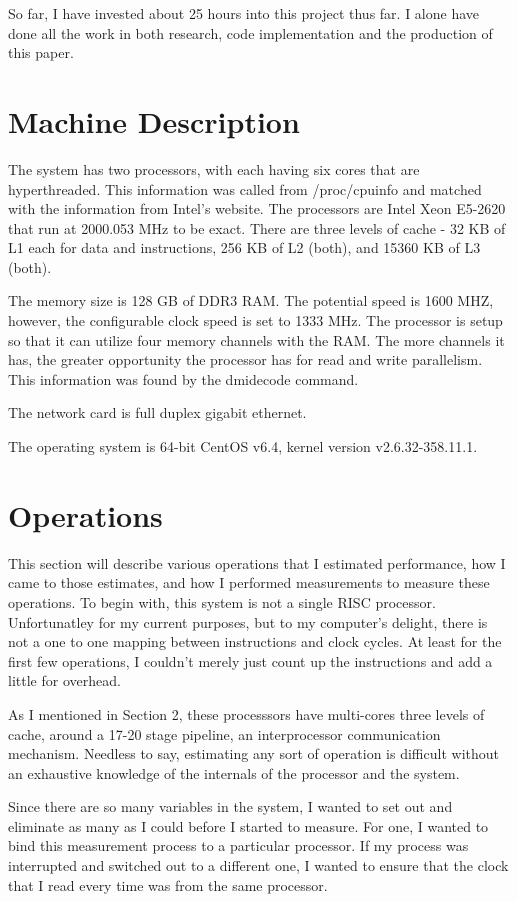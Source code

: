 \documentclass[paper=a4, fontsize=11pt]{scrartcl}
\numberwithin{equation}{section}        %
\numberwithin{figure}{section}          %
\numberwithin{table}{section}               %
\begin{document}
So far, I have invested about 25 hours into this project thus far.  I alone have done all the work in both research, code implementation and the production of this paper.

\section{Machine Description}

The system has two processors, with each having six cores that are hyperthreaded.  This information was called from /proc/cpuinfo and matched with the information from Intel's website.  The processors are Intel Xeon E5-2620 that run at 2000.053 MHz to be exact.  There are three levels of cache - 32 KB of L1 each for data and instructions, 256 KB of L2 (both), and 15360 KB of L3 (both).  

The memory size is 128 GB of DDR3 RAM.  The potential speed is 1600 MHZ, however, the configurable clock speed is set to 1333 MHz.  The processor is setup so that it can utilize four memory channels with the RAM.  The more channels it has, the greater opportunity the processor has for read and write parallelism.  This information was found by the dmidecode command.

The network card is full duplex gigabit ethernet.

The operating system is 64-bit CentOS v6.4, kernel version v2.6.32-358.11.1.

\section{Operations}
This section will describe various operations that I estimated performance, how I came to those estimates, and how I performed measurements to measure these operations.  To begin with, this system is not a single RISC processor.  Unfortunatley for my current purposes, but to my computer's delight, there is not a one to one mapping between instructions and clock cycles.  At least for the first few operations, I couldn't merely just count up the instructions and add a little for overhead.

As I mentioned in Section 2, these processsors have multi-cores three levels of cache, around a 17-20 stage pipeline, an interprocessor communication mechanism.  Needless to say, estimating any sort of operation is difficult without an exhaustive knowledge of the internals of the processor and the system.

Since there are so many variables in the system, I wanted to set out and eliminate as many as I could before I started to measure.  For one, I wanted to bind this measurement process to a particular processor.  If my process was interrupted and switched out to a different one, I wanted to ensure that the clock that I read every time was from the same processor.
\end{document}
